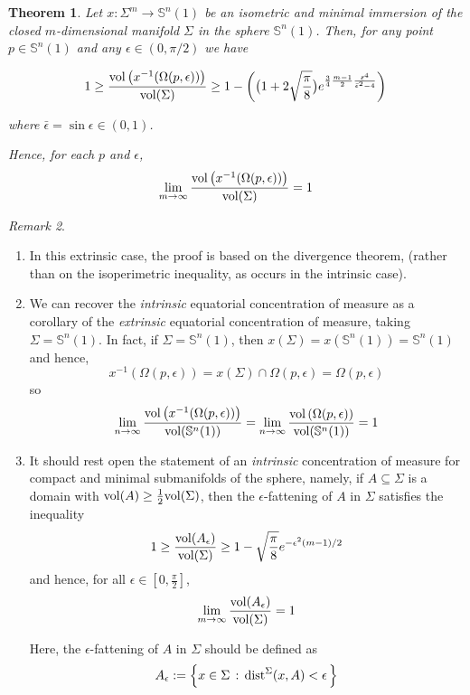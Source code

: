 \documentclass{amsart}
\newtheorem{theorem}{Theorem}[section]
\theoremstyle{definition}
\theoremstyle{remark}
\newtheorem{remark}[theorem]{Remark}
\begin{document}
\begin{theorem}
Let  $x: \Sigma^m \to \mathbb{S}^n(1)$ be an isometric and minimal immersion of the closed $m$-dimensional manifold $\Sigma$ in the sphere  $\mathbb{S}^n(1)$. Then, for any point $p \in \mathbb{S}^n(1)$ and any  $\epsilon \in (0,\pi/2)$ we have 

$$
1\geq \frac{{\rm vol}\left(x^{-1}(\Omega(p,\epsilon))\right)}{{\rm vol}(\Sigma)}\geq 1- \bigg(\big( 1+2 \sqrt{\frac{\pi}{8}} \big)e^{\frac{3}{4}\frac{m-1}{2}\frac{\bar\epsilon^4}{\bar\epsilon^2-4}}\bigg)
$$

\noindent where $\bar\epsilon=\sin\epsilon \in (0,1)$.


\noindent Hence, for each $p$ and $\epsilon$,
$$
\lim_{m\to\infty}\frac{{\rm vol}\left(x^{-1}(\Omega(p,\epsilon))\right)}{{\rm vol}(\Sigma)}=1
$$


\end{theorem}

\begin{remark}\

\begin{enumerate}
\item In this extrinsic case, the proof is based on the divergence theorem, (rather than on the isoperimetric inequality, as occurs in the intrinsic case).

\item We can recover the {\em intrinsic} equatorial concentration of measure as a corollary of the {\em extrinsic} equatorial  concentration of measure, taking $\Sigma=\mathbb{S}^n(1)$. In fact, if $\Sigma=\mathbb{S}^n(1)$, then $x(\Sigma) =x(\mathbb{S}^n(1))=\mathbb{S}^n(1)$ and hence, 
$$x^{-1}(\Omega(p,\epsilon))=x(\Sigma) \cap \Omega(p,\epsilon) =\Omega(p,\epsilon)$$
\noindent so
$$
\lim_{n\to\infty}\frac{{\rm vol}\left(x^{-1}(\Omega(p,\epsilon))\right)}{{\rm vol}(\mathbb{S}^n(1))}=\lim_{n\to\infty}\frac{{\rm vol}\left(\Omega(p,\epsilon)\right)}{{\rm vol}(\mathbb{S}^n(1))}=1
$$

\item  It should rest open the statement of an {\em intrinsic} concentration of measure for compact and minimal submanifolds of the sphere, namely, if $A \subseteq \Sigma$ is a domain with ${\rm vol}(A) \geq \frac{1}{2} {\rm vol}(\Sigma)$, then the $\epsilon$-fattening of $A$ in $\Sigma$ satisfies the inequality
\begin{equation*}
1 \geq \frac{{\rm vol}(A_\epsilon)}{{\rm vol}(\Sigma)}\geq 1-\sqrt{\frac{\pi}{8}}e^{-\epsilon^2(m-1)/2}
\end{equation*}
\noindent and hence, for all $\epsilon \in [0,\frac{\pi}{2}]$, 
\begin{equation*}
\lim_{m\to \infty} \frac{{\rm vol}(A_\epsilon)}{{\rm vol}(\Sigma)}= 1
\end{equation*}
 

Here, the $\epsilon$-fattening of $A$ in $\Sigma$ should be defined as
$$A_\epsilon:=\left\{x\in \Sigma\, :\, {\rm dist}^{\Sigma}(x,A)<\epsilon\, \right\}
$$

\end{enumerate}
\end{remark}
\end{document}
